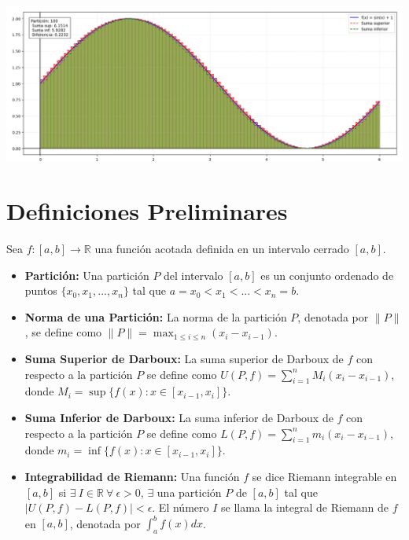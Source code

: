 \documentclass{article}
\begin{document}
\begin{center}
    \includegraphics[width=1\textwidth]{Figure_3.png}
\end{center}

\section{Definiciones Preliminares}
	Sea $f: [a, b] \rightarrow \mathbb{R}$ una función acotada definida en un intervalo cerrado $[a, b]$.
	
	\begin{itemize}
		\item \textbf{Partición:} Una partición $P$ del intervalo $[a, b]$ es un conjunto ordenado de puntos $\{x_0, x_1, ..., x_n\}$ tal que $a = x_0 < x_1 < ... < x_n = b$.
		
		\item \textbf{Norma de una Partición:} La norma de la partición $P$, denotada por $\|P\|$, se define como $\|P\| = \max_{1 \leq i \leq n} (x_i - x_{i-1})$.
		
		\item \textbf{Suma Superior de Darboux:} La suma superior de Darboux de $f$ con respecto a la partición $P$ se define como $U(P, f) = \sum_{i=1}^{n} M_i (x_i - x_{i-1})$, donde $M_i = \sup\{f(x) : x \in [x_{i-1}, x_i]\}$.
		
		\item \textbf{Suma Inferior de Darboux:} La suma inferior de Darboux de $f$ con respecto a la partición $P$ se define como $L(P, f) = \sum_{i=1}^{n} m_i (x_i - x_{i-1})$, donde $m_i = \inf\{f(x) : x \in [x_{i-1}, x_i]\}$.
		
		\item \textbf{Integrabilidad de Riemann:} Una función $f$ se dice Riemann integrable en $[a, b]$ si $\exists\ I \in \mathbb{R}\ \forall\ \epsilon > 0$, $\exists$ una partición $P$ de $[a, b]$ tal que $|U(P, f) - L(P, f)| < \epsilon$. El número $I$ se llama la integral de Riemann de $f$ en $[a, b]$, denotada por $\int_{a}^{b} f(x) dx$.
	\end{itemize}
	
\end{document}
